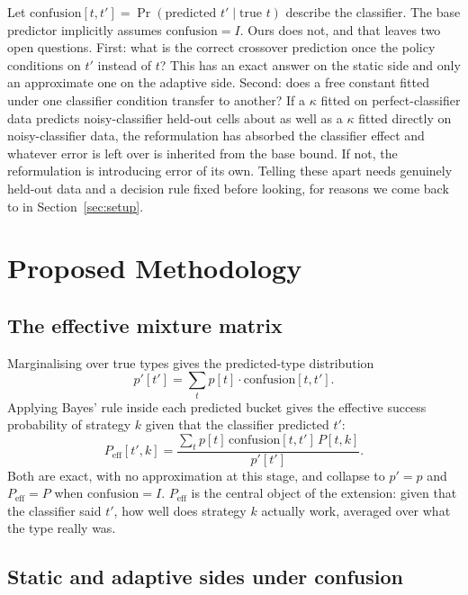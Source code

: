 \documentclass[conference]{IEEEtran}
\begin{document}
Let $\mathrm{confusion}[t,t'] = \Pr(\text{predicted } t' \mid \text{true }
t)$ describe the classifier. The base predictor implicitly assumes
$\mathrm{confusion} = I$. Ours does not, and that leaves two open
questions. First: what is the correct crossover prediction once the
policy conditions on $t'$ instead of $t$? This has an exact answer on the
static side and only an approximate one on the adaptive side. Second:
does a free constant fitted under one classifier condition transfer to
another? If a $\kappa$ fitted on perfect-classifier data predicts
noisy-classifier held-out cells about as well as a $\kappa$ fitted
directly on noisy-classifier data, the reformulation has absorbed the
classifier effect and whatever error is left over is inherited from the
base bound. If not, the reformulation is introducing error of its own.
Telling these apart needs genuinely held-out data and a decision rule
fixed before looking, for reasons we come back to in
Section~\ref{sec:setup}.

\section{Proposed Methodology}
\label{sec:method}

\subsection{The effective mixture matrix}

Marginalising over true types gives the predicted-type distribution
\begin{equation}
p'[t'] = \sum_t p[t] \cdot \mathrm{confusion}[t,t']. \label{eq:marginal}
\end{equation}
Applying Bayes' rule inside each predicted bucket gives the effective
success probability of strategy $k$ given that the classifier predicted
$t'$:
\begin{equation}
P_{\mathrm{eff}}[t',k] = \frac{\sum_t p[t]\,\mathrm{confusion}[t,t']\,P[t,k]}{p'[t']}. \label{eq:peff}
\end{equation}
Both are exact, with no approximation at this stage, and collapse to $p'
= p$ and $P_{\mathrm{eff}} = P$ when $\mathrm{confusion} = I$.
$P_{\mathrm{eff}}$ is the central object of the extension: given that the
classifier said $t'$, how well does strategy $k$ actually work, averaged
over what the type really was.

\subsection{Static and adaptive sides under confusion}
\end{document}
